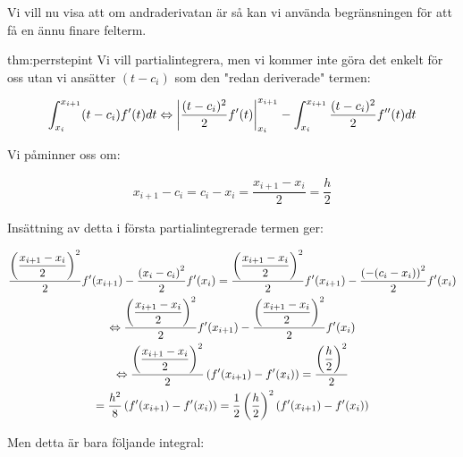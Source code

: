 \pagebreak
\noindent Vi vill nu visa att om andraderivatan är så kan vi använda begränsningen för att få en ännu finare felterm.
\begin{lem}{thm:perrstepint}
   \noindent Vi vill partialintegrera, men vi kommer inte göra det enkelt för oss utan vi ansätter $(t-c_i)$ som den "redan deriverade" termen:
   \par\bigskip

   \begin{equation*}
     \begin{gathered}
       \int_{x_i}^{x_{i+1}}(t-c_i)f^{\prime}(t)dt\Leftrightarrow \left|\dfrac{(t-c_i)^2}{2}f^{\prime}(t)\right|_{x_i}^{x_{i+1}}-\int_{x_i}^{x_{i+1}}\dfrac{(t-c_i)^2}{2}f^{\prime\prime}(t)dt\\
     \end{gathered}
   \end{equation*}
   \par\bigskip
   \noindent Vi påminner oss om:

   \begin{equation*}
     \begin{gathered}
       x_{i+1}-c_i = c_i-x_i = \dfrac{x_{i+1}-x_i}{2} = \dfrac{h}{2}
     \end{gathered}
   \end{equation*}
   \par\bigskip
   \noindent Insättning av detta i första partialintegrerade termen ger:


   \begin{equation*}
     \begin{gathered}
       \dfrac{\left(\dfrac{x_{i+1}-x_i}{2}\right)^2}{2}f^{\prime}(x_{i+1})-\dfrac{\left(x_i-c_i\right)^2}{2}f^{\prime}(x_i) = \dfrac{\left(\dfrac{x_{i+1}-x_i}{2}\right)^2}{2}f^{\prime}(x_{i+1})-\dfrac{\left(-(c_i-x_i)\right)^2}{2}f^{\prime}(x_i)\\
       \Leftrightarrow \dfrac{\left(\dfrac{x_{i+1}-x_i}{2}\right)^2}{2}f^{\prime}(x_{i+1})-\dfrac{\left(\dfrac{x_{i+1}-x_i}{2}\right)^2}{2}f^{\prime}(x_i)\\
       \Leftrightarrow \dfrac{\left(\dfrac{x_{i+1}-x_i}{2}\right)^2}{2}\left(f^{\prime}(x_{i+1})-f^{\prime}(x_i)\right) = \dfrac{\left(\dfrac{h}{2}\right)^2}{2}\\
       = \dfrac{h^2}{8}\left(f^{\prime}(x_{i+1})-f^{\prime}(x_i)\right) = \dfrac{1}{2}\left(\dfrac{h}{2}\right)^2\left(f^{\prime}(x_{i+1})-f^{\prime}(x_i)\right)\\
     \end{gathered}
   \end{equation*}
   \par\bigskip
   \noindent Men detta är bara följande integral:


\end{lem}
